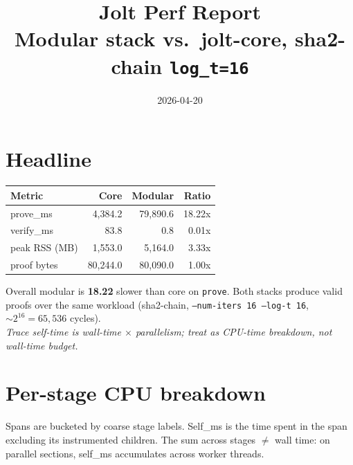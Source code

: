 \documentclass[10pt,a4paper]{article}
\title{\vspace{-1.6cm}\textbf{Jolt Perf Report}\\\large Modular stack vs.\ jolt-core, sha2-chain \texttt{log\_t=16}}
\author{}
\date{2026-04-20}
\begin{document}
\maketitle

\section*{Headline}
\begin{tcolorbox}[colback=gray!6,colframe=gray!40,sharp corners]
\par\medskip\noindent\begin{tabular}{l r r r}
\textbf{Metric} & \textbf{Core} & \textbf{Modular} & \textbf{Ratio} \\ \midrule
prove\_ms & 4,384.2 & 79,890.6 & 18.22x \\
verify\_ms & 83.8 & 0.8 & 0.01x \\
peak RSS (MB) & 1,553.0 & 5,164.0 & 3.33x \\
proof bytes & 80,244.0 & 80,090.0 & 1.00x \\
\end{tabular}\par\medskip
\end{tcolorbox}
\noindent Overall modular is \textbf{18.22\texttimes{}} slower than core on \texttt{prove}. Both stacks produce valid proofs over the same workload (sha2-chain, \texttt{--num-iters 16 --log-t 16}, $\sim 2^{16} = 65{,}536$ cycles).\\
\noindent\emph{Trace self-time is wall-time $\times$ parallelism; treat as CPU-time breakdown, not wall-time budget.}

\section{Per-stage CPU breakdown}
Spans are bucketed by coarse stage labels. Self\_ms is the time spent in the span excluding its instrumented children. The sum across stages $\neq$ wall time: on parallel sections, self\_ms accumulates across worker threads.
\end{document}

